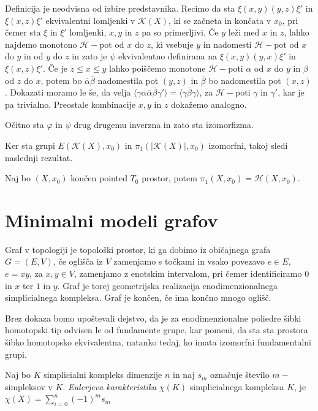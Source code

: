 \documentclass[mat1]{fmfdelo}
\DeclareRobustCommand{\k}{
    \mathcal{K}
}
\DeclareRobustCommand{\h}{
    \mathcal{H}
}
\DeclareRobustCommand{\pot}{
    $\h-$pot
}
\begin{document}
\begin{dokaz}
Definicija je neodvisna od izbire predstavnika. Recimo da sta $\xi(x,y)(y,z)\xi'$ in $\xi(x,z)\xi'$ ekvivalentni lomljenki v $\k(X)$, ki se začneta in končata v $x_0$, pri čemer sta $\xi$ in $\xi'$ lomljenki, $x,y$ in $z$ pa so primerljivi.
Če $y$ leži med $x$ in $z$, lahko najdemo monotono $\mathcal{H}-$pot od $x$ do $z$, ki vsebuje $y$ in nadomesti \pot od $x$ do $y$ in od $y$ do $z$ in zato je $\psi$ ekvivalentno definirana na $\xi(x,y)(y,x)\xi'$ in $\xi(x,z)\xi'$.
Če je $z\leq x \leq y$ lahko poiščemo monotone $\mathcal{H}-$poti $\alpha$ od $x$ do $y$ in $\beta$ od $z$ do $x$, potem bo $\overline{\alpha}\overline{\beta}$ nadomestila pot $(y,z)$ in $\overline{\beta}$ bo nadomestila pot $(x,z)$. Dokazati moramo le še, da velja $\langle\gamma \alpha \overline{\alpha}\overline{\beta}\gamma'\rangle=\langle \gamma\overline{\beta}\gamma\rangle$, za $\h-$poti $\gamma$ in $\gamma'$, kar je pa trivialno. Preostale kombinacije $x,y$ in $z$ dokažemo analogno.

Očitno sta $\varphi$ in $\psi$ drug drugemu inverzna in zato sta izomorfizma.
\end{dokaz}

Ker sta grupi $E(\k(X),x_0)$ in $\pi_1(|\k(X)|,x_0)$ izomorfni, takoj sledi naslednji rezultat.

\begin{posledica}
    Naj bo $(X,x_0)$ končen pointed $T_0$ prostor, potem $\pi_1(X,x_0)=\mathscr{H}(X,x_0)$.
\end{posledica}
\section{Minimalni modeli grafov}

Graf v topologiji je topološki prostor, ki ga dobimo iz običajnega grafa 
$G=(E,V)$, če oglišča iz $V$ zamenjamo s točkami in vsako povezavo $e\in 
E$, $e=xy$, za $x,y\in V$, zamenjamo z enotskim intervalom, pri čemer 
identificiramo $0$ in $x$ ter $1$ in $y$.
Graf je torej geometrijska realizacija enodimenzionalnega simplicialnega 
kompleksa. Graf je končen, če ima končno mnogo oglišč. 

Brez dokaza bomo upoštevali dejstvo, da je za enodimenzionalne poliedre 
šibki homotopski tip odvisen le od fundamente grupe, kar pomeni, da sta 
sta prostora šibko homotopsko ekvivalentna, natanko tedaj, ko imata 
izomorfni fundamentalni grupi.


\begin{definicija}
    Naj bo $K$ simplicialni kompleks dimenzije $n$ in naj $s_m$ označuje število $m-$simpleksov v $K$.
    \textit{Eulerjeva karakteristika} $\chi(K)$ simplicialnega kompleksa $K$, je  $\chi(X)=\sum\limits_{i=0}^n (-1)^m s_m$
\end{definicija}
\end{document}
